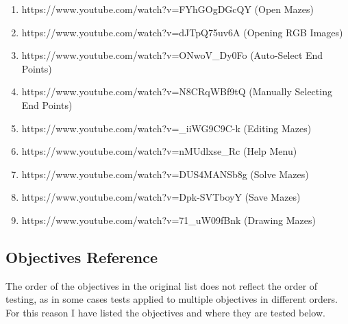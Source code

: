 \documentclass[titlepage]{article}
\begin{document}
\begin{enumerate} [{V}1:]
\item https://www.youtube.com/watch?v=FYhGOgDGcQY (Open Mazes)
\item https://www.youtube.com/watch?v=dJTpQ75uv6A (Opening RGB Images)
\item https://www.youtube.com/watch?v=ONwoV\_Dy0Fo (Auto-Select End Points)
\item https://www.youtube.com/watch?v=N8CRqWBf9tQ (Manually Selecting End Points)
\item https://www.youtube.com/watch?v=\_iiWG9C9C-k (Editing Mazes)
\item https://www.youtube.com/watch?v=nMUdlxse\_Rc (Help Menu)
\item https://www.youtube.com/watch?v=DUS4MANSb8g (Solve Mazes)
\item https://www.youtube.com/watch?v=Dpk-SVTboyY (Save Mazes)
\item https://www.youtube.com/watch?v=71\_uW09fBnk (Drawing Mazes)
\end{enumerate}

\subsection{Objectives Reference}

The order of the objectives in the original list does not reflect the order of testing, as in some cases tests applied to multiple objectives in different orders. For this reason I have listed the objectives and where they are tested below.
\end{document}
